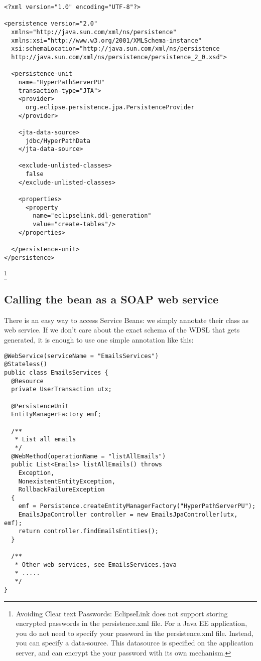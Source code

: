 \begin{lstlisting}[label=Persistence unit persistence.xml,caption=Persistence unit persistence.xml]
<?xml version="1.0" encoding="UTF-8"?>

<persistence version="2.0"
  xmlns="http://java.sun.com/xml/ns/persistence"
  xmlns:xsi="http://www.w3.org/2001/XMLSchema-instance"
  xsi:schemaLocation="http://java.sun.com/xml/ns/persistence
  http://java.sun.com/xml/ns/persistence/persistence_2_0.xsd">

  <persistence-unit
    name="HyperPathServerPU"
    transaction-type="JTA">
    <provider>
      org.eclipse.persistence.jpa.PersistenceProvider
    </provider>

    <jta-data-source>
      jdbc/HyperPathData
    </jta-data-source>

    <exclude-unlisted-classes>
      false
    </exclude-unlisted-classes>

    <properties>
      <property
        name="eclipselink.ddl-generation"
        value="create-tables"/>
    </properties>

  </persistence-unit>
</persistence>
\end{lstlisting}

\footnote{Avoiding Clear text Passwords: EclipseLink does not support storing encrypted passwords in the persistence.xml file. For a Java EE application, you do not need to specify your password in the persistence.xml file. Instead, you can specify a data-source. This datasource is specified on the application server, and can encrypt the your password with its own mechanism.
}

\subsection{Calling the bean as a SOAP web service}
There is an easy way to access Service Beans: we simply annotate their class as web service. If we don’t care about the exact schema of the WDSL that gets generated, it is enough to use one simple annotation like this:

\begin{lstlisting}[label=WebService Bean,caption=WebService Bean]
@WebService(serviceName = "EmailsServices")
@Stateless()
public class EmailsServices {
  @Resource
  private UserTransaction utx;

  @PersistenceUnit
  EntityManagerFactory emf;

  /**
   * List all emails
   */
  @WebMethod(operationName = "listAllEmails")
  public List<Emails> listAllEmails() throws
    Exception,
    NonexistentEntityException,
    RollbackFailureException
  {
    emf = Persistence.createEntityManagerFactory("HyperPathServerPU");
    EmailsJpaController controller = new EmailsJpaController(utx, emf);
    return controller.findEmailsEntities();
  }

  /**
   * Other web services, see EmailsServices.java
   * .....
   */
}
\end{lstlisting}